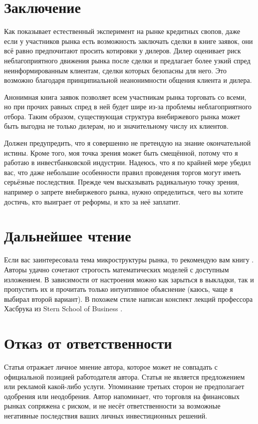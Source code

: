 \section*{Заключение}

Как показывает естественный эксперимент на рынке кредитных свопов, даже если у
участников рынка есть возможность заключать сделки в книге заявок, они всё равно
предпочитают просить котировки у дилеров. Дилер оценивает риск неблагоприятного
движения рынка после сделки и предлагает более узкий спред неинформированным
клиентам, сделки которых безопасны для него. Это возможно благодаря
принципиальной неанонимности общения клиента и дилера.

Анонимная книга заявок позволяет всем участникам рынка торговать со всеми, но
при прочих равных спред в ней будет шире из-за проблемы неблагоприятного отбора.
Таким образом, существующая структура внебиржевого рынка может быть выгодна не
только дилерам, но и значительному числу их клиентов.

Должен предупредить, что я совершенно не претендую на знание окончательной
истины. Кроме того, моя точка зрения может быть смещённой, потому что я работаю
в инвестбанковской индустрии. Надеюсь, что я по крайней мере убедил вас, что
даже небольшие особенности правил проведения торгов могут иметь серьёзные
последствия. Прежде чем высказывать радикальную точку зрения, например о запрете
внебиржевого рынка, нужно определиться, чего вы хотите достичь, кто выиграет от
реформы, и кто за неё заплатит.

\section*{Дальнейшее чтение}

Если вас заинтересовала тема микроструктуры рынка, то рекомендую вам книгу
\cite{foucault2013market}.
Авторы удачно сочетают строгость математических моделей с доступным изложением.
В зависимости от настроения можно как зарыться в выкладки, так и пропустить их и
прочитать только интуитивное объяснение (каюсь, чаще я выбирал второй вариант).
В похожем стиле написан конспект лекций профессора Хасбрука из Stern School of
Business \cite{hasbrouck2017securities}.

\section*{Отказ от ответственности}

Статья отражает личное мнение автора, которое может не совпадать с официальной 
позицией работодателя автора. Статья не является предложением или рекламой 
какой-либо услуги. Упоминание третьих сторон не предполагает одобрения или 
неодобрения. Автор напоминает, что торговля на финансовых рынках сопряжена 
с риском, и не несёт ответственности за возможные негативные последствия ваших 
личных инвестиционных решений.

\begin{otherlanguage}{english}
\printbibliography[title = \begin{otherlanguage}{russian}Список
литературы\end{otherlanguage}]
\end{otherlanguage}

\printendnotes

